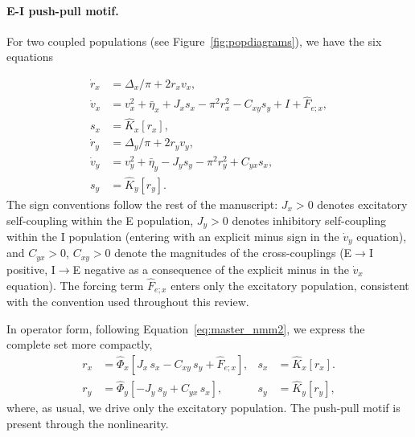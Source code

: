 \documentclass[12pt]{article}
\numberwithin{equation}{section}
\newcommand{\rev}[1]{\begingroup\color{blue}#1\endgroup}
\begin{document}
\paragraph{E-I push-pull motif.}  For two coupled populations (see Figure~\ref{fig:popdiagrams}), we have the six equations

\rev{\begin{equation}
\begin{aligned}
\dot r_x &= \Delta_x/\pi + 2 r_x v_x, \\
\dot v_x &= v_x^2 + \bar\eta_x + J_x s_x - \pi^2 r_x^2 - C_{xy} s_y + I +\hat F_{e;x}, \\
s_x &= \hat K_x[r_x], \\
\dot r_y &= \Delta_y/\pi + 2 r_y v_y, \\
\dot v_y &= v_y^2 + \bar\eta_y - J_y s_y - \pi^2 r_y^2 + C_{yx} s_x, \\
s_y &= \hat K_y[r_y].
\end{aligned}
\label{eq:nmm2-EI-pushpull}
\end{equation}
The sign conventions follow the rest of the manuscript: $J_x>0$ denotes excitatory self-coupling within the E population, $J_y>0$ denotes inhibitory self-coupling within the I population (entering with an explicit minus sign in the $\dot v_y$ equation), and $C_{yx}>0$, $C_{xy}>0$ denote the magnitudes of the cross-couplings (E$\to$I positive, I$\to$E negative as a consequence of the explicit minus in the $\dot v_x$ equation). The forcing term $\hat F_{e;x}$ enters only the excitatory population, consistent with the convention used throughout this review.}

In operator form, following Equation~\ref{eq:master_nmm2}, we express the complete set more compactly,
\begin{equation}
\begin{aligned}
     r_x &=  \hat \Phi_x [J_x\, s_x - C_{xy} \, s_y +\hat F_{e;x}], & 
 s_x &= \hat K_x [r_x]. \\
  r_y &=  \hat \Phi_y [-J_y\, s_y +  C_{yx} \, s_x ], & 
 s_y &= \hat K_y[r_y], 
\end{aligned}
\end{equation}
where, as usual, we drive only the excitatory population. The push-pull motif is present through the nonlinearity. 
\end{document}
